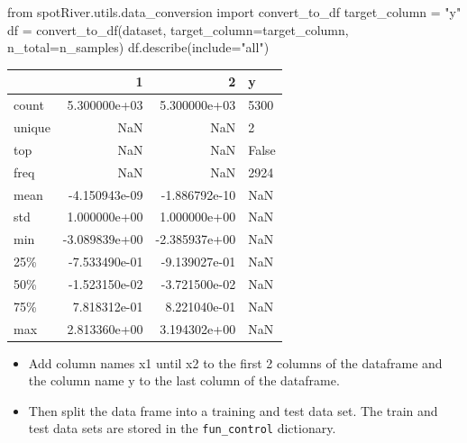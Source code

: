 \documentclass[
  letterpaper,
  DIV=11,
  numbers=noendperiod]{scrreprt}
\newenvironment{Shaded}{\begin{snugshade}}{\end{snugshade}}
\newcommand{\ImportTok}[1]{\textcolor[rgb]{0.00,0.46,0.62}{#1}}
\newcommand{\NormalTok}[1]{\textcolor[rgb]{0.00,0.23,0.31}{#1}}
\newcommand{\OperatorTok}[1]{\textcolor[rgb]{0.37,0.37,0.37}{#1}}
\newcommand{\StringTok}[1]{\textcolor[rgb]{0.13,0.47,0.30}{#1}}
\providecommand{\tightlist}{%
  \setlength{\itemsep}{0pt}\setlength{\parskip}{0pt}}\usepackage{longtable,booktabs,array}
\begin{document}
\begin{Shaded}
\begin{Highlighting}[]
\ImportTok{from}\NormalTok{ spotRiver.utils.data\_conversion }\ImportTok{import}\NormalTok{ convert\_to\_df}
\NormalTok{target\_column }\OperatorTok{=} \StringTok{"y"}
\NormalTok{df }\OperatorTok{=}\NormalTok{ convert\_to\_df(dataset, target\_column}\OperatorTok{=}\NormalTok{target\_column, n\_total}\OperatorTok{=}\NormalTok{n\_samples)}
\NormalTok{df.describe(include}\OperatorTok{=}\StringTok{"all"}\NormalTok{)}
\end{Highlighting}
\end{Shaded}

\begin{tabular}{lrrl}
\toprule
{} &             1 &             2 &      y \\
\midrule
count  &  5.300000e+03 &  5.300000e+03 &   5300 \\
unique &           NaN &           NaN &      2 \\
top    &           NaN &           NaN &  False \\
freq   &           NaN &           NaN &   2924 \\
mean   & -4.150943e-09 & -1.886792e-10 &    NaN \\
std    &  1.000000e+00 &  1.000000e+00 &    NaN \\
min    & -3.089839e+00 & -2.385937e+00 &    NaN \\
25\%    & -7.533490e-01 & -9.139027e-01 &    NaN \\
50\%    & -1.523150e-02 & -3.721500e-02 &    NaN \\
75\%    &  7.818312e-01 &  8.221040e-01 &    NaN \\
max    &  2.813360e+00 &  3.194302e+00 &    NaN \\
\bottomrule
\end{tabular}

\begin{itemize}
\tightlist
\item
  Add column names x1 until x2 to the first 2 columns of the dataframe
  and the column name y to the last column of the dataframe.
\item
  Then split the data frame into a training and test data set. The train
  and test data sets are stored in the \texttt{fun\_control} dictionary.
\end{itemize}
\end{document}
